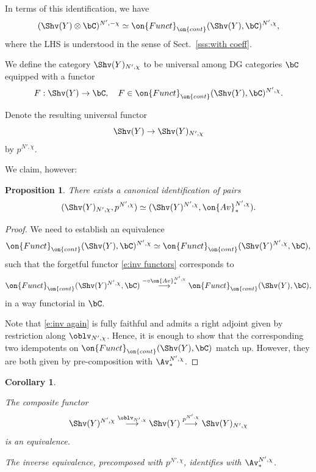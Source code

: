 \documentclass[9pt]{amsart}
\newtheorem{cor}[subsubsection]{Corollary}
\newtheorem{prop}[subsubsection]{Proposition}
\theoremstyle{definition}
\theoremstyle{remark}
\newcommand{\secref}[1]{Sect.~\ref{#1}}
\numberwithin{equation}{section}
\begin{document}
\medskip

In terms of this identification, we have
$$(\Shv(Y)\otimes \bC)^{N',-\chi}\simeq 
\on{Funct}_{\on{cont}}(\Shv(Y),\bC)^{N',\chi},$$
where the LHS is understood in the sense of \secref{sss:with coeff}.

\sssec{}

We define the category $\Shv(Y)_{N',\chi}$ to be universal among DG categories $\bC$ equipped with a functor 
$$F:\Shv(Y)\to \bC, \quad F\in \on{Funct}_{\on{cont}}(\Shv(Y),\bC)^{N',\chi}.$$

Denote the resulting universal functor 
$$\Shv(Y)\to \Shv(Y)_{N',\chi}$$
by $p^{N',\chi}$.

\medskip

We claim, however:

\begin{prop}  \label{p:coinv as inv}
There exists a canonical identification of pairs $$(\Shv(Y)_{N',\chi},p^{N',\chi})\simeq (\Shv(Y)^{N',\chi},\on{Av}^{N',\chi}_*).$$ 
\end{prop}

\begin{proof}

We need to establish an equivalence
$$\on{Funct}_{\on{cont}}(\Shv(Y),\bC)^{N',\chi}\simeq \on{Funct}_{\on{cont}}(\Shv(Y)^{N',\chi},\bC),$$
such that the forgetful functor \eqref{e:inv functors} corresponds to
\begin{equation} \label{e:inv again}
\on{Funct}_{\on{cont}}(\Shv(Y)^{N',\chi},\bC) \overset{-\circ \on{Av}^{N',\chi}_*}\longrightarrow \on{Funct}_{\on{cont}}(\Shv(Y),\bC),
\end{equation} 
in a way functorial in $\bC$.

\medskip

Note that \eqref{e:inv again} is fully faithful and admits a right adjoint given by restriction along $\oblv_{N',\chi}$.
Hence, it is enough to show that the corresponding two idempotents on 
$\on{Funct}_{\on{cont}}(\Shv(Y),\bC)$ match up. However, they are both given by pre-composition with 
$\Av^{N',\chi}_*$. 

\end{proof} 

\begin{cor}  \label{c:coinv as inv} \hfill

\smallskip

The composite functor
$$\Shv(Y)^{N',\chi}\overset{\oblv_{N',\chi}}\longrightarrow  \Shv(Y)\overset{p^{N',\chi}}\longrightarrow \Shv(Y)_{N',\chi}$$
is an equivalence. 

\smallskip

The inverse equivalence, precomposed with $p^{N',\chi}$, identifies with $\Av^{N',\chi}_*$. 

\end{cor}
\end{document}
